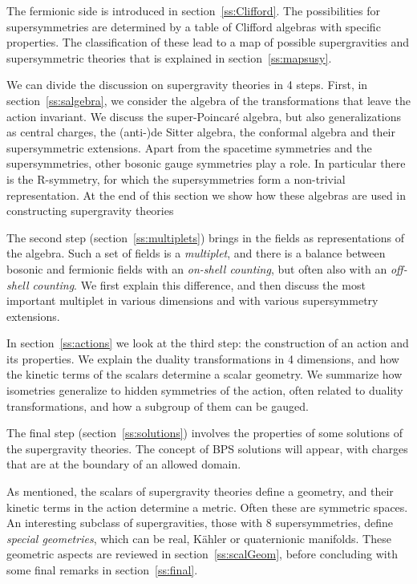 \documentclass[a4paper,11pt,twoside]{article}
\begin{document}
The fermionic side is introduced in section~\ref{ss:Clifford}. The
possibilities for supersymmetries are determined by a table of Clifford
algebras with specific properties. The classification of these lead to a
map of possible supergravities and supersymmetric theories that is
explained in section~\ref{ss:mapsusy}.

We can divide the discussion on supergravity theories in 4 steps. First,
in section~\ref{ss:salgebra}, we consider the algebra of the
transformations that leave the action invariant. We discuss the
super-Poincar{\'e} algebra, but also generalizations as central charges, the
(anti-)de Sitter algebra, the conformal algebra and their supersymmetric
extensions. Apart from the spacetime symmetries and the supersymmetries,
other bosonic gauge symmetries play a role. In particular there is the
R-symmetry, for which the supersymmetries form a non-trivial
representation. At the end of this section we show how these algebras are
used in constructing supergravity theories

The second step (section~\ref{ss:multiplets}) brings in the fields as
representations of the algebra. Such a set of fields is a
\emph{multiplet}, and there is a balance between bosonic and fermionic
fields with an \emph{on-shell counting}, but often also with an
\emph{off-shell counting}. We first explain this difference, and then
discuss the most important multiplet in various dimensions and with
various supersymmetry extensions.

In section~\ref{ss:actions} we look at the third step: the construction
of an action and its properties. We explain the duality transformations
in 4 dimensions, and how the kinetic terms of the scalars determine a
scalar geometry. We summarize how isometries generalize to hidden
symmetries of the action, often related to duality transformations, and
how a subgroup of them can be gauged.

The final step (section~\ref{ss:solutions}) involves the properties of
some solutions of the supergravity theories. The concept of BPS solutions
will appear, with charges that are at the boundary of an allowed domain.

As mentioned, the scalars of supergravity theories define a geometry, and
their kinetic terms in the action determine a metric. Often these are
symmetric spaces. An interesting subclass of supergravities, those with 8
supersymmetries, define \emph{special geometries}, which can be real,
K{\"a}hler or quaternionic manifolds. These geometric aspects are reviewed in
section~\ref{ss:scalGeom}, before concluding with some final remarks in
section~\ref{ss:final}.
\end{document}
